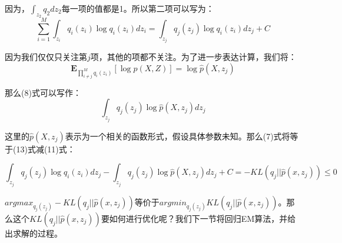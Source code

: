 \documentclass[a4paper]{article}
\begin{document}
因为，$\int_{z_2}q_2dz_2$每一项的值都是1。所以第二项可以写为：
\begin{equation}
    \sum_{i=1}^M \int_{z_i} q_i(z_i)\log q_i(z_i)  dz_i =  \int_{z_j} q_j(z_j)\log q_i(z_i) dz_j + C
\end{equation}

因为我们仅仅只关注第$j$项，其他的项都不关注。为了进一步表达计算，我们将：
\begin{equation}
    \mathbf{E}_{\prod_{i \neq j}^Mq_i(z_i)}\left[ \log p(X,Z) \right] = \log \hat{p}(X,z_j)
\end{equation}

那么(8)式可以写作：
\begin{equation}
    \int_{z_j}q_j(z_j) \log \hat{p}(X,z_j) dz_j
\end{equation}

这里的$\hat{p}(X,z_j)$表示为一个相关的函数形式，假设具体参数未知。那么(7)式将等于(13)式减(11)式：

\begin{equation}
    \int_{z_j} q_j(z_j)\log q_i(z_i) dz_j - \int_{z_j}q_j(z_j) \log \hat{p}(X,z_j) dz_j + C = -KL(q_j || \hat{p}(x,z_j)) \leq 0
\end{equation}

$argmax_{q_j(z_j)}-KL(q_j || \hat{p}(x,z_j))$等价于$argmin_{q_j(z_j)}KL(q_j || \hat{p}(x,z_j))$。那么这个$KL(q_j || \hat{p}(x,z_j))$要如何进行优化呢？我们下一节将回归EM算法，并给出求解的过程。
\end{document}
